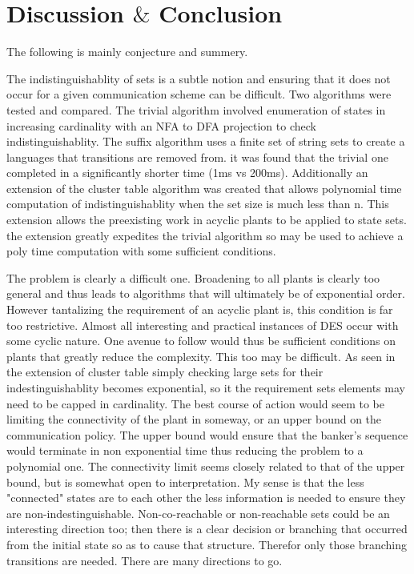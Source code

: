 \documentclass{article}
\begin{document}
	\section{Discussion $\&$ Conclusion}

		The following is mainly conjecture and summery. 

		The indistinguishablity of sets is a subtle notion and ensuring that it does not occur for a given communication scheme can be difficult. Two algorithms were tested and compared. The trivial algorithm involved enumeration of states in increasing cardinality with an NFA to DFA projection to check indistinguishablity. The suffix algorithm uses a finite set of string sets to create a languages that transitions are removed from. it was found that the trivial one completed in a significantly shorter time (1ms vs 200ms). Additionally an extension of the cluster table algorithm was created that allows polynomial time computation of indistinguishablity when the set size is much less than n. This extension allows the preexisting work in acyclic plants to be applied to state sets. the extension greatly expedites the trivial algorithm so may be used to achieve a poly time computation with some sufficient conditions.

		The problem is clearly a difficult one. Broadening to all plants is clearly too general and thus leads to algorithms that will ultimately be of exponential order. However tantalizing the requirement of an acyclic plant is, this condition is far too restrictive. Almost all interesting and practical instances of DES occur with some cyclic nature. One avenue to follow would thus be sufficient conditions on plants that greatly reduce the complexity. This too may be difficult. As seen in the extension of cluster table simply checking large sets for their indestinguishablity becomes exponential, so it the requirement sets elements may need to be capped in cardinality. The best course of action would seem to be limiting the connectivity of the plant in someway, or an upper bound on the communication policy. The upper bound would ensure that the banker's sequence would terminate in non exponential time thus reducing the problem to a polynomial one. The connectivity limit seems closely related to that of the upper bound, but is somewhat open to interpretation. My sense is that the less "connected" states are to each other the less information is needed to ensure they are non-indestinguishable. Non-co-reachable or non-reachable sets could be an interesting direction too; then there is a clear decision or branching that occurred from the initial state so as to cause that structure. Therefor only those branching transitions are needed. There are many directions to go.
\end{document}
